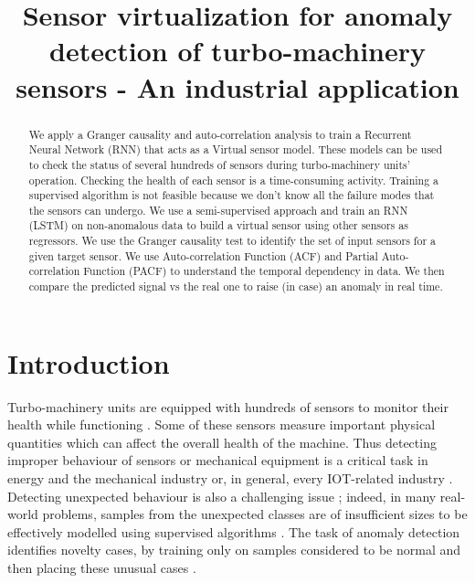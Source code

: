 \documentclass[runningheads]{llncs}
\begin{document}
%
\title{Sensor virtualization for anomaly detection of turbo-machinery sensors - An industrial application} %
%
%
%
%
%
\maketitle              %
%
\begin{abstract}
We apply a Granger causality and auto-correlation analysis to train a Recurrent Neural Network (RNN) that acts as a Virtual sensor model. These models can be used to check the status of several hundreds of sensors during turbo-machinery units’ operation. Checking the health of each sensor is a time-consuming activity. Training a supervised algorithm is not feasible because we don't know all the failure modes that the sensors can undergo. We use a semi-supervised approach and train an RNN (LSTM) on non-anomalous data to build a virtual sensor using other sensors as regressors. We use the Granger causality test to identify the set of input sensors for a given target sensor. We use Auto-correlation Function (ACF) and Partial Auto-correlation Function (PACF) to understand the temporal dependency in data. We then compare the predicted signal vs the real one to raise (in case) an anomaly in real time.

\end{abstract}
%
%
%
\section{Introduction}
Turbo-machinery units are equipped with hundreds of sensors to monitor their health while functioning \cite{gori2022}. Some of these sensors measure important physical quantities which can affect the overall health of the machine. Thus detecting improper behaviour of sensors or mechanical equipment is a critical task in energy \cite{michelassi2018} and the mechanical industry or, in general, every IOT-related industry \cite{iiot2018}. Detecting unexpected behaviour is also a challenging issue \cite{Hodge2004,gori2022}; indeed, in many real-world problems, samples from the unexpected classes are of insufficient sizes to be effectively modelled using supervised algorithms \cite{Zimek2012}. The task of anomaly detection identifies novelty cases, by training only on samples considered to be normal and then placing these unusual cases \cite{akcay2018ganomaly} \cite{akcay2019skipganomaly} \cite{nanduri2016}. 
\end{document}
